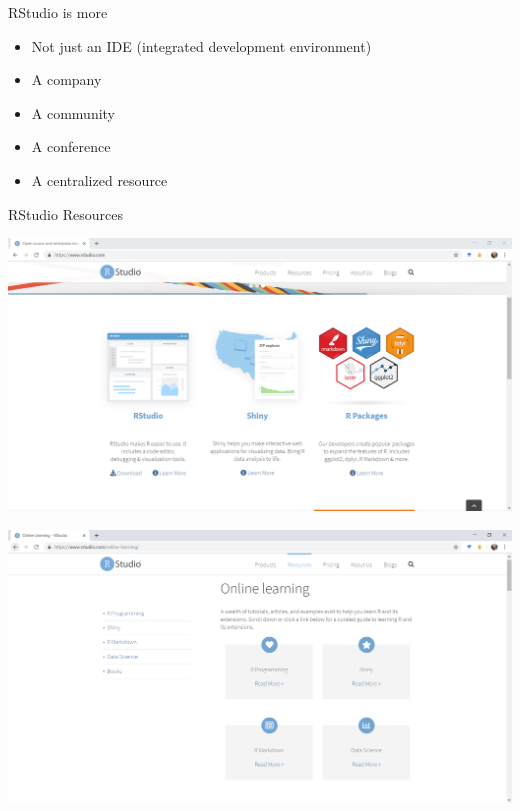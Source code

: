 \documentclass[
  ignorenonframetext,
]{beamer}
\providecommand{\tightlist}{%
  \setlength{\itemsep}{0pt}\setlength{\parskip}{0pt}}
\begin{document}
\begin{frame}{RStudio is more}
\protect\hypertarget{rstudio-is-more}{}

\begin{itemize}[<+->]
\tightlist
\item
  Not just an IDE (integrated development environment)
\item
  A company
\item
  A community
\item
  A conference
\item
  A centralized resource
\end{itemize}

\end{frame}

\begin{frame}{RStudio Resources}
\protect\hypertarget{rstudio-resources}{}

\includegraphics{../external/images/rstudio_dot_com_1_main.PNG}

\end{frame}

\begin{frame}

\includegraphics{../external/images/rstudio_dot_com_2_learning.PNG}

\end{frame}
\end{document}
